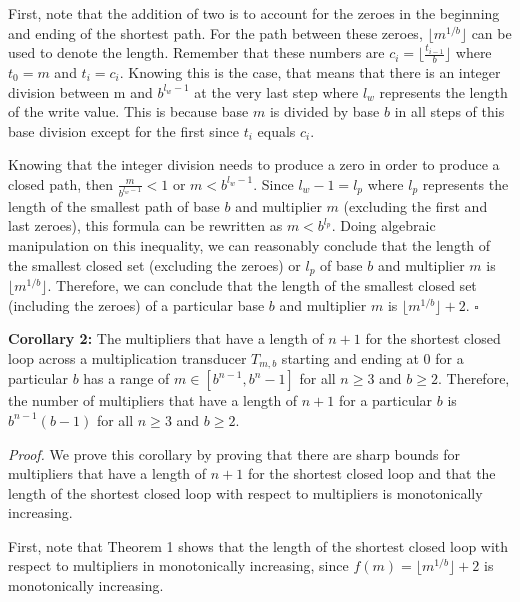 \documentclass{article}
\begin{document}
\noindent
First, note that the addition of two is to account for the zeroes in the beginning and ending of the shortest path. For the path between these zeroes, $\lfloor{m^{1/b}}\rfloor$ can be used to denote the length. Remember that these numbers are $c_i = \lfloor{\frac{t_{i-1}}{b}}\rfloor$ where $t_0 = m$ and $t_i = c_i$. Knowing this is the case, that means that there is an integer division between m and $b^{l_w-1}$ at the very last step where $l_w$ represents the length of the write value. This is because base $m$ is divided by base $b$ in all steps of this base division except for the first since $t_i$ equals $c_i$. \vspace{\baselineskip}

\noindent
Knowing that the integer division needs to produce a zero in order to produce a closed path, then $\frac{m}{b^{l_w -1}} < 1$ or $m < b^{l_w - 1}$. Since $l_w - 1= l_p$ where $l_p$ represents the length of the smallest path of base $b$ and multiplier $m$ (excluding the first and last zeroes), this formula can be rewritten as $m < b^{l_p}$. Doing algebraic manipulation on this inequality, we can reasonably conclude that the length of the smallest closed set (excluding the zeroes) or $l_p$ of base $b$ and multiplier $m$ is $\lfloor{m^{1/b}}\rfloor$. Therefore, we can conclude that the length of the smallest closed set (including the zeroes) of a particular base $b$ and multiplier $m$ is $\lfloor{m^{1/b}}\rfloor + 2$.  $\square$ \vspace{\baselineskip}

\noindent
\textbf{Corollary 2:} The multipliers that have a length of $n + 1$ for the shortest closed loop across a multiplication transducer $T_{m,b}$ starting and ending at $0$ for a particular $b$ has a range of $m \in [b^{n-1}, b^n-1]$ for all $n \geq 3$ and $b \geq 2$. Therefore, the number of multipliers that have a length of $n + 1$ for a particular $b$ is $b^{n-1}(b-1)$ for all $n \geq 3$ and $b \geq 2$. \vspace{\baselineskip}

\noindent
\textit{Proof.} We prove this corollary by proving that there are sharp bounds for multipliers that have a length of $n + 1$ for the shortest closed loop and that the length of the shortest closed loop with respect to multipliers is monotonically increasing. \vspace{\baselineskip}

First, note that Theorem 1 shows that the length of the shortest closed loop with respect to multipliers in monotonically increasing, since $f(m) = \lfloor{m^{1/b}}\rfloor + 2$ is monotonically increasing.\vspace{\baselineskip}
\end{document}
